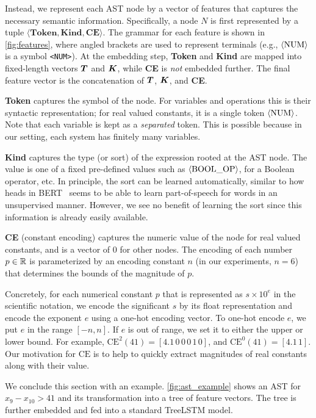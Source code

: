 Instead, we represent each AST node by a vector of features that captures the necessary semantic information. Specifically, a node $N$ is first represented by a tuple $\langle\textbf{Token}, \textbf{Kind}, \textbf{CE} \rangle$. The grammar for each feature is shown in \cref{fig:features}, where angled brackets are used to represent terminals (e.g., $\langle \text{\text{NUM}} \rangle$ is a symbol \texttt{<NUM>}). At the embedding step, \textbf{Token} and \textbf{Kind} are mapped into fixed-length vectors $\boldsymbol{T}$ and $\boldsymbol{K}$, while \textbf{CE} is \emph{not} embedded further. The final feature vector is the concatenation of $\boldsymbol{T}$, $\boldsymbol{K}$, and \textbf{CE}.

\textbf{Token} captures the symbol of the node. For variables and operations this is their syntactic representation; for real valued constants, it is a single token $\langle \text{NUM} \rangle$. Note that each variable is kept as a \emph{separated} token. This is possible because in our setting, each system has finitely many variables.

\textbf{Kind} captures the type (or sort) of the expression rooted at the AST node. The value is one of a fixed pre-defined values such as $\langle \text{\text{BOOL\_OP}} \rangle$, for a Boolean operator, etc. In principle, the sort can be learned automatically, similar to how heads in BERT~\cite{bert} seems to be able to learn part-of-speech for words in an unsupervised manner. However, we see no benefit of learning the sort since this information is already easily available.

\textbf{CE} (constant encoding) captures the numeric value of the node for real valued constants, and is a vector of $0$ for other nodes. The encoding of each number $p \in \mathbb{R}$ is parameterized by an encoding constant $n$ (in our experiments, $n = 6$) that determines the bounds of the magnitude of $p$.

Concretely, for each numerical constant $p$ that is represented as $s \times 10^{e}$ in the scientific notation, we encode the significant $s$ by its float representation and encode the exponent $e$ using a one-hot encoding vector. To one-hot encode $e$, we put $e$ in the range $[-n, n]$. If $e$ is out of range, we set it to either the upper or lower bound. For example, $\text{CE}^{2}(41) = [4.1 \, 0\, 0\, 0\, 1\, 0]$, and $\text{CE}^0(41) = [4.1 \, 1 ]$.  Our  motivation for $\text{CE}$ is to help \dpy to quickly extract  magnitudes of real constants along with their value.

We conclude this section with an example. \cref{fig:ast_example} shows an AST for $x_9 - x_{10} > 41$ and its transformation into a tree of feature vectors. The tree is further embedded and fed into a standard TreeLSTM model.

